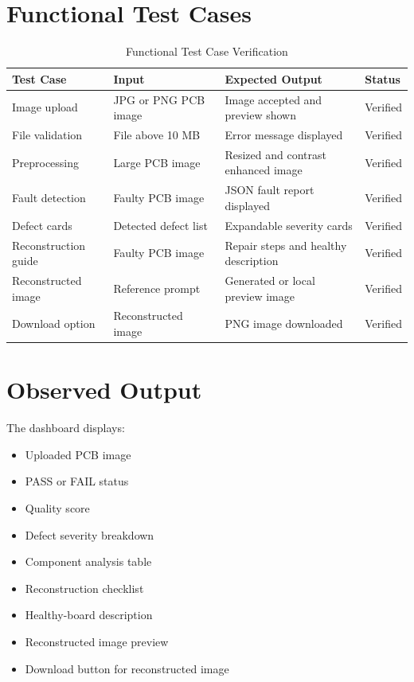 \documentclass[12pt,a4paper]{report}
\begin{document}
\section{Functional Test Cases}

\begin{table}[H]
    \centering
    \begin{tabular}{p{4cm} p{5cm} p{4cm} p{2cm}}
        \toprule
        \textbf{Test Case} & \textbf{Input} & \textbf{Expected Output} & \textbf{Status}\\
        \midrule
        Image upload & JPG or PNG PCB image & Image accepted and preview shown & Verified\\
        File validation & File above 10 MB & Error message displayed & Verified\\
        Preprocessing & Large PCB image & Resized and contrast enhanced image & Verified\\
        Fault detection & Faulty PCB image & JSON fault report displayed & Verified\\
        Defect cards & Detected defect list & Expandable severity cards & Verified\\
        Reconstruction guide & Faulty PCB image & Repair steps and healthy description & Verified\\
        Reconstructed image & Reference prompt & Generated or local preview image & Verified\\
        Download option & Reconstructed image & PNG image downloaded & Verified\\
        \bottomrule
    \end{tabular}
    \caption{Functional Test Case Verification}
\end{table}

\section{Observed Output}

The dashboard displays:

\begin{itemize}
    \item Uploaded PCB image
    \item PASS or FAIL status
    \item Quality score
    \item Defect severity breakdown
    \item Component analysis table
    \item Reconstruction checklist
    \item Healthy-board description
    \item Reconstructed image preview
    \item Download button for reconstructed image
\end{itemize}
\end{document}
